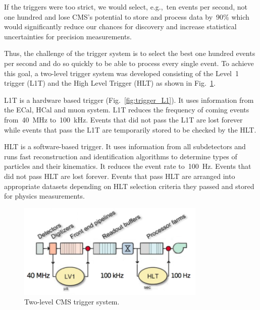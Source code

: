 If the triggers were too strict, we would select, e.g.,~ten events per second, not one hundred and lose CMS's potential to store and process data by~90\% which would significantly reduce our chances for discovery and increase statistical uncertainties for precision measurements.

Thus, the challenge of the trigger system is to select the best one hundred events per second and do so quickly to be able to process every single event. To achieve this goal, a two-level trigger system was developed consisting of the Level~1 trigger (L1T) and the High Level Trigger (HLT) as shown in Fig.~\ref{fig:trigger_2level}.

L1T is a hardware based trigger (Fig.~\ref{fig:trigger_L1}). It uses information from the ECal, HCal and muon system. L1T reduces the frequency of coming events from~40~MHz to~100~kHz. Events that did not pass the L1T are lost forever while events that pass the L1T are temporarily stored to be checked by the HLT.

HLT is a software-based trigger. It uses information from all subdetectors and runs fast reconstruction and identification algorithms to determine types of particles and their kinematics. It reduces the event rate to~100~Hz. Events that did not pass HLT are lost forever. Events that pass HLT are arranged into appropriate datasets depending on HLT selection criteria they passed and stored for physics measurements.

\begin{figure}[htb]
  \begin{center}
    \includegraphics[width=0.8\textwidth]{../figs/Exp/trigger_2level.png}
    \caption{Two-level CMS trigger system.}
    \label{fig:trigger_2level}
  \end{center}
\end{figure}

